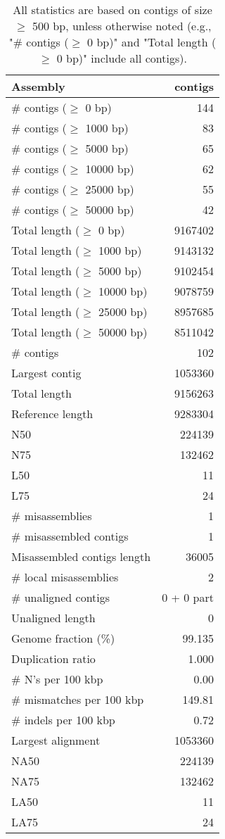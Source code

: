 \documentclass[12pt,a4paper]{article}
\begin{document}
\begin{table}[ht]
\begin{center}
\caption{All statistics are based on contigs of size $\geq$ 500 bp, unless otherwise noted (e.g., "\# contigs ($\geq$ 0 bp)" and "Total length ($\geq$ 0 bp)" include all contigs).}
\begin{tabular}{|l*{1}{|r}|}
\hline
Assembly & contigs \\ \hline
\# contigs ($\geq$ 0 bp) & 144 \\ \hline
\# contigs ($\geq$ 1000 bp) & 83 \\ \hline
\# contigs ($\geq$ 5000 bp) & 65 \\ \hline
\# contigs ($\geq$ 10000 bp) & 62 \\ \hline
\# contigs ($\geq$ 25000 bp) & 55 \\ \hline
\# contigs ($\geq$ 50000 bp) & 42 \\ \hline
Total length ($\geq$ 0 bp) & 9167402 \\ \hline
Total length ($\geq$ 1000 bp) & 9143132 \\ \hline
Total length ($\geq$ 5000 bp) & 9102454 \\ \hline
Total length ($\geq$ 10000 bp) & 9078759 \\ \hline
Total length ($\geq$ 25000 bp) & 8957685 \\ \hline
Total length ($\geq$ 50000 bp) & 8511042 \\ \hline
\# contigs & 102 \\ \hline
Largest contig & 1053360 \\ \hline
Total length & 9156263 \\ \hline
Reference length & 9283304 \\ \hline
N50 & 224139 \\ \hline
N75 & 132462 \\ \hline
L50 & 11 \\ \hline
L75 & 24 \\ \hline
\# misassemblies & 1 \\ \hline
\# misassembled contigs & 1 \\ \hline
Misassembled contigs length & 36005 \\ \hline
\# local misassemblies & 2 \\ \hline
\# unaligned contigs & 0 + 0 part \\ \hline
Unaligned length & 0 \\ \hline
Genome fraction (\%) & 99.135 \\ \hline
Duplication ratio & 1.000 \\ \hline
\# N's per 100 kbp & 0.00 \\ \hline
\# mismatches per 100 kbp & 149.81 \\ \hline
\# indels per 100 kbp & 0.72 \\ \hline
Largest alignment & 1053360 \\ \hline
NA50 & 224139 \\ \hline
NA75 & 132462 \\ \hline
LA50 & 11 \\ \hline
LA75 & 24 \\ \hline
\end{tabular}
\end{center}
\end{table}
\end{document}
